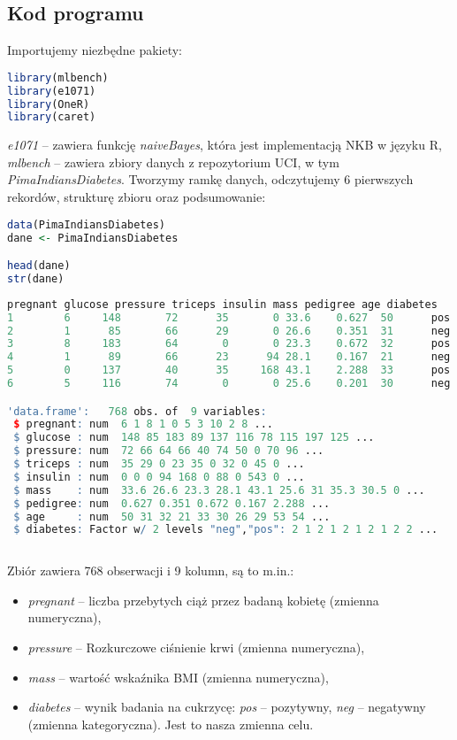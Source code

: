 \documentclass[a4paper]{article}
\begin{document}
\subsection{Kod programu}
Importujemy niezbędne pakiety:
\begin{lstlisting}[language=R, frame=single]
library(mlbench)
library(e1071)
library(OneR)
library(caret)
\end{lstlisting}
\textit{e1071} -- zawiera funkcję \textit{naiveBayes}, która jest implementacją NKB w języku R, \textit{mlbench} -- zawiera zbiory danych z repozytorium UCI, w tym \textit{PimaIndiansDiabetes}. Tworzymy ramkę danych, odczytujemy 6 pierwszych rekordów, strukturę zbioru oraz podsumowanie:
\begin{lstlisting}[language=R, frame=single]
data(PimaIndiansDiabetes)
dane <- PimaIndiansDiabetes

head(dane)
str(dane)
\end{lstlisting}
\begin{lstlisting}[language=R, frame=single]
  pregnant glucose pressure triceps insulin mass pedigree age diabetes
1        6     148       72      35       0 33.6    0.627  50      pos
2        1      85       66      29       0 26.6    0.351  31      neg
3        8     183       64       0       0 23.3    0.672  32      pos
4        1      89       66      23      94 28.1    0.167  21      neg
5        0     137       40      35     168 43.1    2.288  33      pos
6        5     116       74       0       0 25.6    0.201  30      neg

'data.frame':	768 obs. of  9 variables:
 $ pregnant: num  6 1 8 1 0 5 3 10 2 8 ...
 $ glucose : num  148 85 183 89 137 116 78 115 197 125 ...
 $ pressure: num  72 66 64 66 40 74 50 0 70 96 ...
 $ triceps : num  35 29 0 23 35 0 32 0 45 0 ...
 $ insulin : num  0 0 0 94 168 0 88 0 543 0 ...
 $ mass    : num  33.6 26.6 23.3 28.1 43.1 25.6 31 35.3 30.5 0 ...
 $ pedigree: num  0.627 0.351 0.672 0.167 2.288 ...
 $ age     : num  50 31 32 21 33 30 26 29 53 54 ...
 $ diabetes: Factor w/ 2 levels "neg","pos": 2 1 2 1 2 1 2 1 2 2 ...
 
\end{lstlisting}
Zbiór zawiera 768 obserwacji i 9 kolumn, są to m.in.:
\begin{itemize}
    \item \textit{pregnant} -- liczba przebytych ciąż przez badaną kobietę (zmienna numeryczna),
    \item \textit{pressure} -- Rozkurczowe ciśnienie krwi (zmienna numeryczna),
    \item \textit{mass} -- wartość wskaźnika BMI (zmienna numeryczna),
    \item \textit{diabetes} -- wynik badania na cukrzycę: \textit{pos} -- pozytywny, \textit{neg} -- negatywny (zmienna kategoryczna). Jest to nasza zmienna celu. 
\end{itemize}
\end{document}
